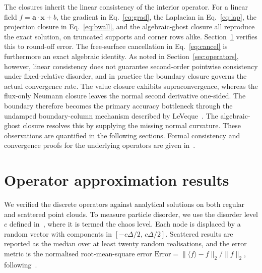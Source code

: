 \documentclass[preprint,review,12pt]{elsarticle}
\begin{document}
The closures inherit the linear consistency of the interior operator.
For a linear field $f=\mathbf a\cdot\mathbf x+b$, the gradient in Eq.~\eqref{eq:grad}, the Laplacian in Eq.~\eqref{eq:lap}, the projection closure in Eq.~\eqref{eq:bwall}, and the algebraic-ghost closure all reproduce the exact solution, on truncated supports and corner rows alike.
Section~\ref{sec:opresults} verifies this to round-off error.
The free-surface cancellation in Eq.~\eqref{eq:cancel} is furthermore an exact algebraic identity.
As noted in Section~\ref{sec:operators}, however, linear consistency does not guarantee second-order pointwise consistency under fixed-relative disorder, and in practice the boundary closure governs the actual convergence rate.
The value closure exhibits supraconvergence, whereas the flux-only Neumann closure leaves the normal second derivative one-sided.
The boundary therefore becomes the primary accuracy bottleneck through the undamped boundary-column mechanism described by LeVeque~\cite[\S2.12]{LeVeque2007}.
The algebraic-ghost closure resolves this by supplying the missing normal curvature.
These observations are quantified in the following sections.
Formal consistency and convergence proofs for the underlying operators are given in~\cite{Basic2018,Lanson2008a}.

\section{Operator approximation results}
\label{sec:opresults}

We verified the discrete operators against analytical solutions on both regular and scattered point clouds.
To measure particle disorder, we use the disorder level $c$ defined in~\cite{Basic2018}, where it is termed the chaos level.
Each node is displaced by a random vector with components in $[-c\Delta/2,\,c\Delta/2]$.
Scattered results are reported as the median over at least twenty random realisations, and the error metric is the normalised root-mean-square error $\mathrm{Error}=\|\langle f\rangle-f\|_2/\|f\|_2$, following~\cite{Basic2018}.
\end{document}
